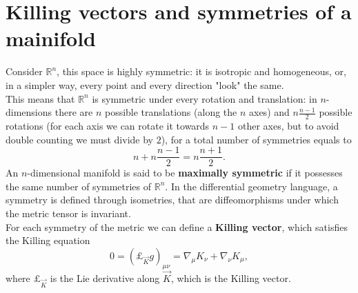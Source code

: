 \label{app:MaxSymm}
\section{Killing vectors and symmetries of a mainifold}
Consider $\mathbb{R}^n$, this space is highly symmetric: it is isotropic and homogeneous, or, in a simpler way, every point and every direction "look" the same.\\
This means that $\mathbb{R}^n$ is symmetric under every rotation and translation: in $n$-dimensions there are $n$ possible translations (along the $n$ axes) and $n\frac{n-1}{2}$ possible rotations (for each axis we can rotate it towards $n-1$ other axes, but to avoid double counting we must divide by $2$), for a total number of symmetries equals to $$n+n\frac{n-1}{2}=n\frac{n+1}{2}.$$ 
An $n$-dimensional manifold is said to be \textbf{maximally symmetric} if it possesses the same number of symmetries of $\mathbb{R}^n$. In the differential geometry language, a symmetry is defined through isometries, that are diffeomorphisms under which the metric tensor is invariant.\\
For each symmetry of the metric we can define a \textbf{Killing vector}, which satisfies the Killing equation 
\begin{equation}
    0=(\pounds_{\vec K}g)_{\mu\nu}=\nabla_\mu K_\nu+\nabla_\nu K_\mu, \label{KillingEq}
\end{equation}
where $\pounds_{\vec{K}}$ is the Lie derivative along $\vec K$, which is the Killing vector.

